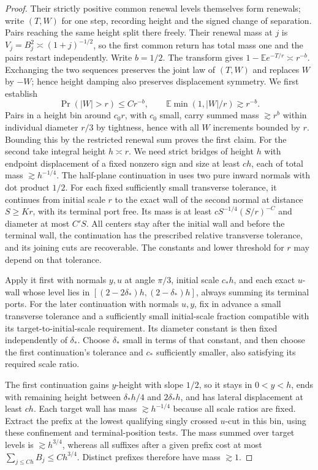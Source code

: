 \documentclass[11pt]{article}
\numberwithin{equation}{section}
\theoremstyle{definition}\newtheorem{definition}[theorem]{Definition}
\theoremstyle{remark}\newtheorem{remark}[theorem]{Remark}
\begin{document}
\begin{proof}
Their strictly positive common renewal levels themselves form renewals;
write $(T,W)$ for one step, recording height and the signed change of
separation. Pairs reaching the same height split there freely. Their
renewal mass at $j$ is $V_j=B_j^2\asymp(1+j)^{-1/2}$, so the first common
return has total mass one and the pairs restart independently.
Write $b=1/2$. The transform gives
$1-\mathbb E e^{-T/r}\asymp r^{-b}$. Exchanging the two sequences preserves
the joint law of $(T,W)$ and replaces $W$ by $-W$; hence height damping
also preserves displacement symmetry. We first establish
\[
 \Pr(|W|>r)\le C r^{-b},\qquad
 \mathbb E\min(1,|W|/r)\gtrsim r^{-b}.
\]
Pairs in a height bin around \(c_0 r\), with \(c_0\) small, carry summed mass \(\gtrsim r^b\) within individual diameter \(r/3\) by tightness, hence with all \(W\) increments bounded by \(r\). Bounding this by the restricted renewal sum proves the first claim. For the second take integral height \(h\asymp r\). We need strict bridges of height $h$ with endpoint displacement of a fixed nonzero sign and size at least $ch$, each of total mass $\gtrsim h^{-1/4}$. The half-plane continuation in \cite[Section~11, Recoverable half-plane growth]{Calibrated} uses two pure inward normals with dot product $1/2$. For each fixed sufficiently small transverse tolerance, it continues from initial scale $r$ to the exact wall of the second normal at distance $S\ge Kr$, with its terminal port free. Its mass is at least $cS^{-1/4}(S/r)^{-C}$ and diameter at most $C'S$. All centers stay after the initial wall and before the terminal wall, the continuation has the prescribed relative transverse tolerance, and its joining cuts are recoverable. The constants and lower threshold for $r$ may depend on that tolerance.

Apply it first with normals $y,u$ at angle $\pi/3$, initial scale $c_*h$,
and each exact $u$-wall whose level lies in
$[(2-2\delta_*)h,(2-\delta_*)h]$, always summing its terminal ports.
For the later continuation with normals $u,y$, fix in advance a small
transverse tolerance and a sufficiently small initial-scale fraction
compatible with its target-to-initial-scale requirement. Its diameter
constant is then fixed independently of $\delta_*$. Choose $\delta_*$
small in terms of that constant, and then choose the first continuation's
tolerance and $c_*$ sufficiently smaller, also satisfying its required
scale ratio.

The first continuation gains $y$-height with slope $1/2$, so it stays in
$0<y<h$, ends with remaining height between $\delta_*h/4$ and
$2\delta_*h$, and has lateral displacement at least $ch$. Each target
wall has mass $\gtrsim h^{-1/4}$ because all scale ratios are fixed.
Extract the prefix at the lowest qualifying singly crossed $u$-cut in
this bin, using these confinement and terminal-position tests. The mass
summed over target levels is $\gtrsim h^{3/4}$, whereas all suffixes after
a given prefix cost at most $\sum_{j\le Ch}B_j\le Ch^{3/4}$. Distinct
prefixes therefore have mass $\gtrsim1$.


\end{proof}
\end{document}
